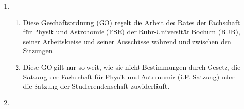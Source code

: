 \documentclass[a4paper, 12pt, ngerman]{article}
\newcommand{\rat}{FSR}
\newcommand{\go}{GO}
\newcommand{\satzung}{Satzung}
\begin{document}
	\begin{enumerate}[leftmargin=0cm]
		
	\item {}
	
	\begin{enumerate}[leftmargin=0cm]
		\item Diese Geschäftsordnung (\go) regelt die Arbeit des
		Rates der Fachschaft für Physik und Astronomie (\rat) der Ruhr-Universität Bochum
		(RUB), seiner Arbeitskreise und seiner Ausschüsse während und zwischen den
		Sitzungen.
		\item Diese GO gilt nur so weit, wie sie nicht Bestimmungen durch Gesetz, die Satzung der Fachschaft für Physik und Astronomie (i.F. \satzung) oder die Satzung der Studierendenschaft zuwiderläuft.
	\end{enumerate}
	

	\item {}\label{Amter}
	

\end{enumerate}
\end{document}
